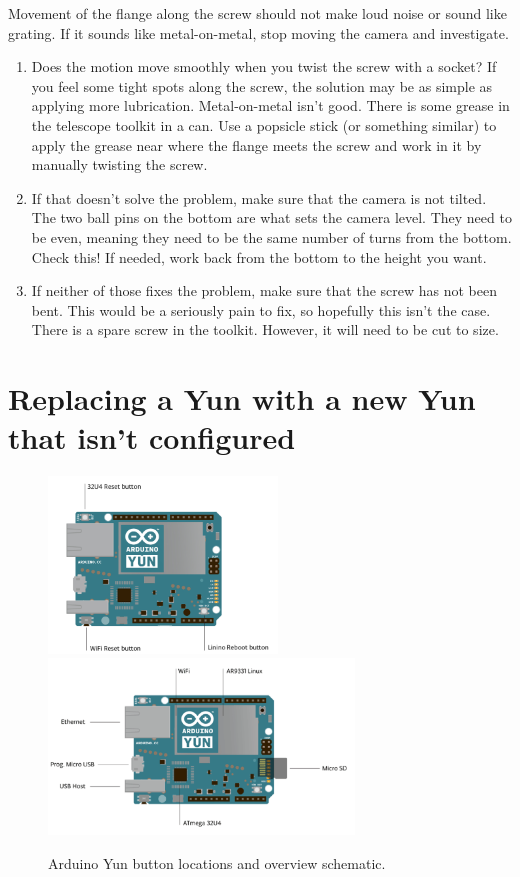 \documentclass[11pt]{article}
\begin{document}
Movement of the flange along the screw should not make loud noise or sound like grating.
If it sounds like metal-on-metal, stop moving the camera and investigate.
\begin{enumerate}
	\item Does the motion move smoothly when you twist the screw with a socket?  If you feel some tight spots along the 
		screw, the solution may be as simple as applying more lubrication.  Metal-on-metal isn't good.  
		There is some grease in the telescope toolkit in a can.  Use a popsicle stick (or something similar) to apply the
		grease near where the flange meets the screw and work in it by manually twisting the screw.
	\item If that doesn't solve the problem, make sure that the camera is not tilted.  
		The two ball pins on the bottom are what sets the camera level.  
		They need to be even, meaning they need to be the same number of turns from the bottom.  Check this!  
		If needed, work back from the bottom to the height you want.
	\item If neither of those fixes the problem, make sure that the screw has not been bent.  
		This would be a seriously pain to fix, so hopefully this isn't the case.  There is a spare screw in the toolkit.
		However, it will need to be cut to size.
\end{enumerate}


\section{Replacing a Yun with a new Yun that isn't configured}

\begin{figure}[h]
\begin{center}
\includegraphics[width = 2.4in]{arduino1.png}
\includegraphics[width = 3.2in]{arduino2.png}
\caption{Arduino Yun button locations and overview schematic.}  
\label{YunFig}
\end{center}
\end{figure}
\end{document}
